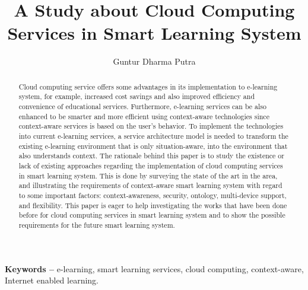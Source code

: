 \documentclass{article}
\begin{document}
\title{A Study about Cloud Computing Services in Smart Learning System}
\author{Guntur Dharma Putra}
\date{}

\maketitle

\begin{abstract}
Cloud computing service offers some advantages in its implementation to e-learning system, for example, increased cost savings and also improved efficiency and convenience of educational services. Furthermore, e-learning services can be also enhanced to be smarter and more efficient using context-aware technologies since context-aware services is based on the user’s behavior. To implement  the technologies into current e-learning services, a service architecture model is needed to transform the existing e-learning environment that is only situation-aware, into the environment that also understands context. The rationale behind this paper is to study the existence or lack of existing approaches regarding the implementation of cloud computing services in smart learning system. This is done by surveying the state of the art in the area, and illustrating the requirements of context-aware smart learning system with regard to some important factors: context-awareness, security, ontology, multi-device support, and flexibility. This paper is eager to help investigating the works that have been done before for cloud computing services in smart learning system and to show the possible requirements for the future smart learning system.
\end{abstract}
\smallskip
\noindent \textbf{Keywords --} e-learning, smart learning services, cloud computing, context-aware, Internet enabled learning.
\end{document}
